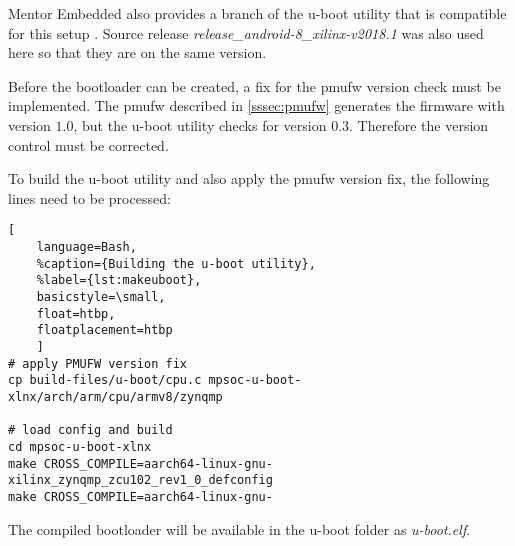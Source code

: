 Mentor Embedded also provides a branch of the u-boot utility that is compatible for this setup \cite{uboot}. Source release \emph{release_android-8_xilinx-v2018.1} was also used here so that they are on the same version.

Before the bootloader can be created, a fix for the \gls{pmufw} version check must be implemented. The \gls{pmufw} described in \cref{sssec:pmufw} generates the firmware with version $1.0$, but the u-boot utility checks for version $0.3$. Therefore the version control must be corrected.

To build the u-boot utility and also apply the \gls{pmufw} version fix, the following lines need to be processed:
\begin{lstlisting}[
	language=Bash,
	%caption={Building the u-boot utility},
	%label={lst:makeuboot},
	basicstyle=\small,
	float=htbp,
	floatplacement=htbp
	]
# apply PMUFW version fix
cp build-files/u-boot/cpu.c mpsoc-u-boot-xlnx/arch/arm/cpu/armv8/zynqmp

# load config and build
cd mpsoc-u-boot-xlnx
make CROSS_COMPILE=aarch64-linux-gnu- xilinx_zynqmp_zcu102_rev1_0_defconfig
make CROSS_COMPILE=aarch64-linux-gnu-
\end{lstlisting}

The compiled bootloader will be available in the u-boot folder as \emph{u-boot.elf}.